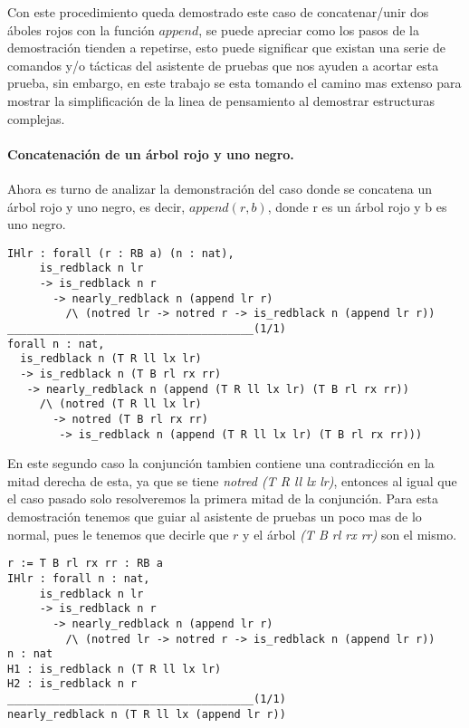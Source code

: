 Con este procedimiento queda demostrado este caso de concatenar/unir dos \'aboles rojos con la funci\'on
$append$, se puede apreciar como los pasos de la demostraci\'on tienden a repetirse, esto puede
significar que existan una serie de comandos y/o t\'acticas del asistente de pruebas que nos ayuden a acortar
esta prueba, sin embargo, en este trabajo se esta tomando el camino mas extenso para mostrar la
simplificaci\'on de la linea de pensamiento al demostrar estructuras complejas.

\paragraph{Concatenaci\'on de un \'arbol rojo y uno negro.}

Ahora es turno de analizar la demonstraci\'on del caso donde se concatena un \'arbol rojo y uno negro, es decir, $append(r,b)$, donde r es un \'arbol rojo y b es uno negro.

\begin{verbatim}
IHlr : forall (r : RB a) (n : nat),
     is_redblack n lr
     -> is_redblack n r
       -> nearly_redblack n (append lr r)
         /\ (notred lr -> notred r -> is_redblack n (append lr r))
______________________________________(1/1)
forall n : nat,
  is_redblack n (T R ll lx lr)
  -> is_redblack n (T B rl rx rr)
   -> nearly_redblack n (append (T R ll lx lr) (T B rl rx rr))
     /\ (notred (T R ll lx lr)
       -> notred (T B rl rx rr)
        -> is_redblack n (append (T R ll lx lr) (T B rl rx rr)))
\end{verbatim}

En este segundo caso la conjunci\'on tambien contiene una contradicci\'on en la mitad derecha de
esta, ya que se tiene \textit{notred (T R ll lx lr)}, entonces al igual que el caso pasado solo
resolveremos la primera mitad de la conjunci\'on. Para esta demostración tenemos que guiar al asistente de pruebas un poco mas de lo normal, pues le tenemos que decirle que $r$ y el árbol \textit{(T B rl rx rr)} son el mismo.

\begin{verbatim}
r := T B rl rx rr : RB a
IHlr : forall n : nat,
     is_redblack n lr
     -> is_redblack n r
       -> nearly_redblack n (append lr r)
         /\ (notred lr -> notred r -> is_redblack n (append lr r))
n : nat
H1 : is_redblack n (T R ll lx lr)
H2 : is_redblack n r
______________________________________(1/1)
nearly_redblack n (T R ll lx (append lr r))
\end{verbatim}

